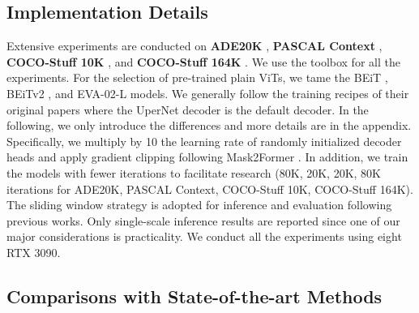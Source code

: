 \documentclass{article} \usepackage{iclr2024_conference,times}
\begin{document}
\subsection{Implementation Details}

Extensive experiments are conducted on \textbf{ADE20K} \citep{zhou2017scene}, \textbf{PASCAL Context} \citep{mottaghi2014role}, \textbf{COCO-Stuff 10K} \citep{caesar2018coco}, and \textbf{COCO-Stuff 164K} \citep{caesar2018coco}. We use the  \citep{contributors2020mmsegmentation} toolbox for all the experiments. For the selection of pre-trained plain ViTs, we tame the BEiT \citep{bao2022beit}, BEiTv2 \citep{peng2022beit}, and EVA-02-L \citep{fang2023eva} models. We generally follow the training recipes of their original papers where the UperNet decoder is the default decoder. In the following, we only introduce the differences and more details are in the appendix. Specifically, we multiply by 10 the learning rate of randomly initialized decoder heads and apply gradient clipping following Mask2Former \citep{cheng2022masked}. In addition, we train the models with fewer iterations to facilitate research (80K, 20K, 20K, 80K iterations for ADE20K, PASCAL Context, COCO-Stuff 10K, COCO-Stuff 164K). The sliding window strategy is adopted for inference and evaluation following previous works. Only single-scale inference results are reported since one of our major considerations is practicality. We conduct all the experiments using eight RTX 3090.

\subsection{Comparisons with State-of-the-art Methods}
\end{document}
